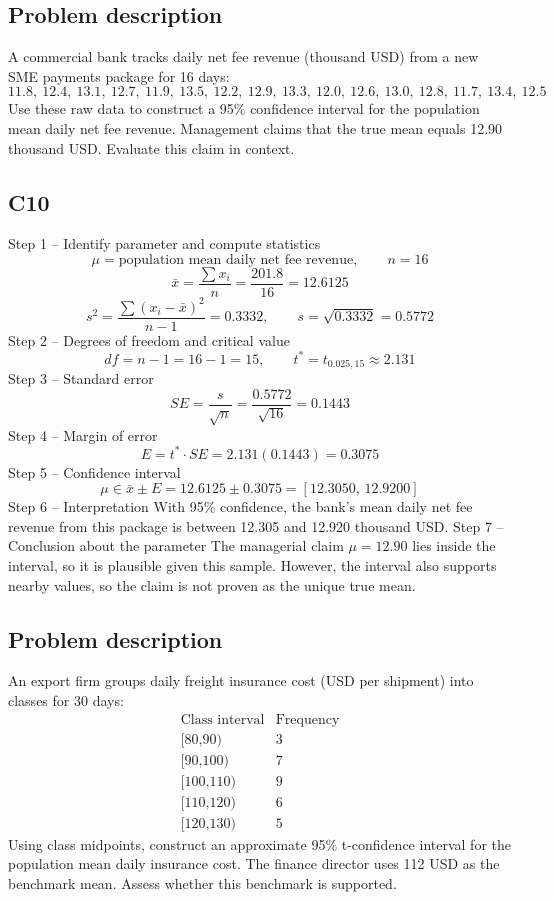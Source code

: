 	\begin{ExamProblems}
		\item
		\subsection*{Problem description}
		A commercial bank tracks daily net fee revenue (thousand USD) from a new SME payments package for 16 days:
		\[
		11.8,\ 12.4,\ 13.1,\ 12.7,\ 11.9,\ 13.5,\ 12.2,\ 12.9,\ 13.3,\ 12.0,\ 12.6,\ 13.0,\ 12.8,\ 11.7,\ 13.4,\ 12.5
		\]
		Use these raw data to construct a 95\% confidence interval for the population mean daily net fee revenue.
		Management claims that the true mean equals 12.90 thousand USD.
		Evaluate this claim in context.
		
		\subsection*{C10}
		Step 1 -- Identify parameter and compute statistics
		\[
		\mu=\text{population mean daily net fee revenue},\qquad n=16
		\]
		\[
		\bar{x}=\frac{\sum x_i}{n}=\frac{201.8}{16}=12.6125
		\]
		\[
		s^2=\frac{\sum (x_i-\bar{x})^2}{n-1}=0.3332,\qquad s=\sqrt{0.3332}=0.5772
		\]
		Step 2 -- Degrees of freedom and critical value
		\[
		df=n-1=16-1=15,\qquad t^*=t_{0.025,15}\approx 2.131
		\]
		Step 3 -- Standard error
		\[
		SE=\frac{s}{\sqrt{n}}=\frac{0.5772}{\sqrt{16}}=0.1443
		\]
		Step 4 -- Margin of error
		\[
		E=t^*\cdot SE=2.131(0.1443)=0.3075
		\]
		Step 5 -- Confidence interval
		\[
		\mu\in \bar{x}\pm E=12.6125\pm 0.3075=[12.3050,\,12.9200]
		\]
		Step 6 -- Interpretation
		With 95\% confidence, the bank's mean daily net fee revenue from this package is between 12.305 and 12.920 thousand USD.
		Step 7 -- Conclusion about the parameter
		The managerial claim $\mu=12.90$ lies inside the interval, so it is plausible given this sample.
		However, the interval also supports nearby values, so the claim is not proven as the unique true mean.
		
		\newpage
		\item
		\subsection*{Problem description}
		An export firm groups daily freight insurance cost (USD per shipment) into classes for 30 days:
		\[
		\begin{array}{c|c}
		\text{Class interval} & \text{Frequency}\\ \hline
		\text{[80,90)} & 3\\
		\text{[90,100)} & 7\\
		\text{[100,110)} & 9\\
		\text{[110,120)} & 6\\
		\text{[120,130)} & 5
		\end{array}
		\]
		Using class midpoints, construct an approximate 95\% t-confidence interval for the population mean daily insurance cost.
		The finance director uses 112 USD as the benchmark mean.
		Assess whether this benchmark is supported.
		

\end{ExamProblems}
